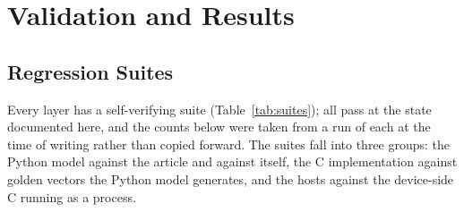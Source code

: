 \section{Validation and Results}
\label{sec:results}

\subsection{Regression Suites}

Every layer has a self-verifying suite (Table~\ref{tab:suites}); all
pass at the state documented here, and the counts below were taken
from a run of each at the time of writing rather than copied forward.
The suites fall into three groups: the Python model against the
article and against itself, the C implementation against golden
vectors the Python model generates, and the hosts against the
device-side C running as a process.

